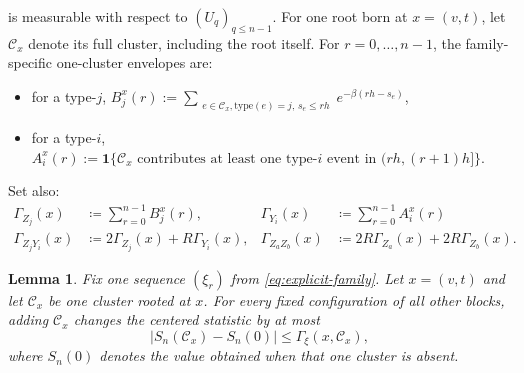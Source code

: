 \documentclass{article}
\newtheorem{lemma}{Lemma}[section]
\begin{document}
is measurable with respect to $(U_q)_{q\le n-1}$. For one root born at $x=(v,t)$, let $\mathcal C_x$ denote its full cluster, including the root itself. For $r=0,\dots,n-1$, the family-specific one-cluster envelopes are:
\begin{itemize}
    \item for a type-$j$, $B_j^x(r):=\sum_{\substack{e\in \mathcal C_x, \mathrm{type}(e)=j,\, s_e\le rh}} e^{-\beta(rh-s_e)}$,
    \item for a type-$i$, $A_i^x(r):=\textbf{1}\{\mathcal C_x \text{ contributes at least one type-}i\text{ event in }(rh,(r+1)h]\}.$
\end{itemize}
Set also:
\begin{align}
\Gamma_{Z_j}(x)   &\coloneqq \sum_{r=0}^{n-1} B_j^x(r), & \Gamma_{Y_i}(x)   &\coloneqq \sum_{r=0}^{n-1} A_i^x(r) \label{eq:Gamma-Z-Y-main} \\
\Gamma_{Z_jY_i}(x) &\coloneqq 2\Gamma_{Z_j}(x)+R\Gamma_{Y_i}(x), & \Gamma_{Z_aZ_b}(x) &\coloneqq 2R\Gamma_{Z_a}(x)+2R\Gamma_{Z_b}(x). \label{eq:Gamma-ZY-ZZ-main}
\end{align}
\begin{lemma}
\label{lem:one-cluster-add-one}
Fix one sequence $(\xi_r)$ from \eqref{eq:explicit-family}. Let $x=(v,t)$ and let $\mathcal C_x$ be one cluster rooted at $x$. For every fixed configuration of all other blocks, adding $\mathcal C_x$ changes the centered statistic by at most
\[
\bigl|S_n(\mathcal C_x)-S_n(0)\bigr|\le \Gamma_\xi(x,\mathcal C_x),
\]
where $S_n(0)$ denotes the value obtained when that one cluster is absent.
\end{lemma}
\end{document}
